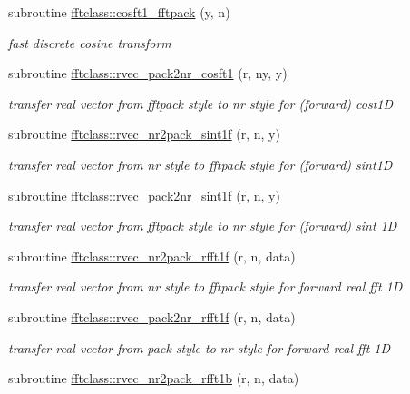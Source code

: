 \begin{DoxyCompactItemize}
subroutine \mbox{\hyperlink{namespacefftclass_ac4347b89b0b1a5894943daa3f37c54ee}{fftclass\+::cosft1\+\_\+fftpack}} (y, n)
\begin{DoxyCompactList}\small\item\em fast discrete cosine transform \end{DoxyCompactList}\item 
subroutine \mbox{\hyperlink{namespacefftclass_a8f3b38a9f0433b6b847b670b98acab99}{fftclass\+::rvec\+\_\+pack2nr\+\_\+cosft1}} (r, ny, y)
\begin{DoxyCompactList}\small\item\em transfer real vector from fftpack style to nr style for (forward) cost1D \end{DoxyCompactList}\item 
subroutine \mbox{\hyperlink{namespacefftclass_ae1f9bdd4e66db530852187dff115ae36}{fftclass\+::rvec\+\_\+nr2pack\+\_\+sint1f}} (r, n, y)
\begin{DoxyCompactList}\small\item\em transfer real vector from nr style to fftpack style for (forward) sint1D \end{DoxyCompactList}\item 
subroutine \mbox{\hyperlink{namespacefftclass_a667b3d13eccd40bf9e60f379f6d44e04}{fftclass\+::rvec\+\_\+pack2nr\+\_\+sint1f}} (r, n, y)
\begin{DoxyCompactList}\small\item\em transfer real vector from fftpack style to nr style for (forward) sint 1D \end{DoxyCompactList}\item 
subroutine \mbox{\hyperlink{namespacefftclass_ac09ed442a8bb7846768adbe2d5c798c6}{fftclass\+::rvec\+\_\+nr2pack\+\_\+rfft1f}} (r, n, data)
\begin{DoxyCompactList}\small\item\em transfer real vector from nr style to fftpack style for forward real fft 1D \end{DoxyCompactList}\item 
subroutine \mbox{\hyperlink{namespacefftclass_ac898bf50e64ca8c43e8d9fa0c2c85919}{fftclass\+::rvec\+\_\+pack2nr\+\_\+rfft1f}} (r, n, data)
\begin{DoxyCompactList}\small\item\em transfer real vector from pack style to nr style for forward real fft 1D \end{DoxyCompactList}\item 
subroutine \mbox{\hyperlink{namespacefftclass_a78a858cc72da790e88dc826f5bdd14b3}{fftclass\+::rvec\+\_\+nr2pack\+\_\+rfft1b}} (r, n, data)

\end{DoxyCompactItemize}
